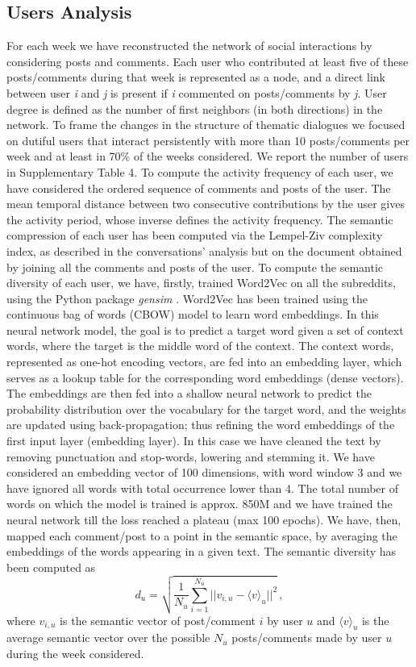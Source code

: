 \documentclass[fleqn,10pt]{wlscirep}
\begin{document}
\subsection*{Users Analysis}
%
For each week we have reconstructed the network of social interactions by considering posts and comments. Each user who contributed at least five of these posts/comments during that week is represented as a node, and a direct link between user \emph{i} and \emph{j} is present if \emph{i} commented on posts/comments by \emph{j}. 
User degree is defined as the number of first neighbors (in both directions) in the network.
%
To frame the changes in the structure of thematic dialogues we focused on dutiful users that interact persistently with more than 10 posts/comments per week and at least in 70\% of the weeks considered. We report the number of users in Supplementary Table 4.
%
To compute the activity frequency of each user, we have considered the ordered sequence of comments and posts of the user. The mean temporal distance between two consecutive contributions by the user gives the activity period, whose inverse defines the activity frequency.
%
The semantic compression of each user has been computed via the Lempel-Ziv complexity index, as described in the conversations' analysis but on the document obtained by joining all the comments and posts of the user.
%
To compute the semantic diversity of each user, we have, firstly, trained Word2Vec \cite{mikolov2013distributed} on all the subreddits, using the Python package \emph{gensim} \cite{rehurek2011gensim}. 
Word2Vec has been trained using the continuous bag of words (CBOW) model to learn word embeddings. In this neural network model, the goal is to predict a target word given a set of context words, where the target is the middle word of the context. The context words, represented as one-hot encoding vectors, are fed into an embedding layer, which serves as a lookup table for the corresponding word embeddings (dense vectors). The embeddings are then fed into a shallow neural network to predict the probability distribution over the vocabulary for the target word, and the weights are updated using back-propagation; thus refining the word embeddings of the first input layer (embedding layer).
In this case we have cleaned the text by removing punctuation and stop-words, lowering and stemming it. We have considered an embedding vector of 100 dimensions, with word window 3 and we have ignored all words with total occurrence lower than 4. The total number of words on which the model is trained is approx. 850M and we have trained the neural network till the loss reached a plateau (max 100 epochs).
We have, then, mapped each comment/post to a point in the semantic space, by averaging the embeddings of the words appearing in a given text. The semantic diversity has been computed as
\begin{equation}
	d_u = \sqrt{\frac{1}{N_u}\sum_{i=1}^{N_u}||v_{i,u}-\langle v\rangle_{u}||^2}\,,
\end{equation}
where $v_{i,u}$ is the semantic vector of post/comment $i$ by user $u$ and $\langle v\rangle_u$ is the average semantic vector over the possible $N_u$ posts/comments made by user $u$ during the week considered.
\end{document}
